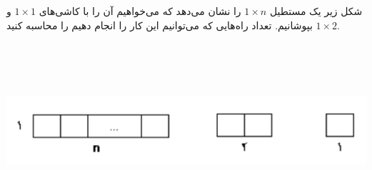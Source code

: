 \EXERCISE
شکل زیر یک مستطیل
$1 \times n$
را نشان می‌دهد که می‌خواهیم آن را با کاشی‌های
$1 \times 1$
و
$1 \times 2$
بپوشانیم. تعداد راه‌هایی که می‌توانیم این کار را انجام دهیم را محاسبه کنید.
\begin{center}
\includegraphics[height=6.5cm]{17.png}
\end{center}